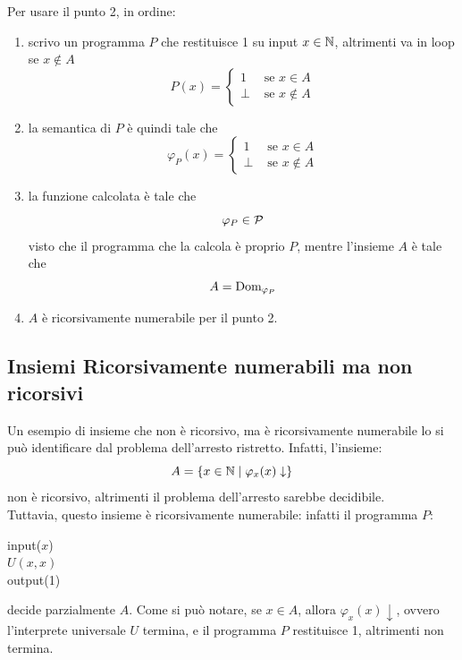 Per usare il punto 2, in ordine: 
\begin{enumerate}
	\item scrivo un programma $P$ che restituisce 1 su input $x \in \mathbb{N}$, altrimenti va in loop se $x \notin A$
	$$ 
	P(x) = \begin{cases}
		1 & \text{ se } x \in A \\
		\bot & \text{ se } x \notin A
	\end{cases}
	$$
	\item la semantica di $P$ è quindi tale che
	$$ 
	\varphi_P (x) = \begin{cases}
		1 & \text{ se } x \in A \\
		\bot & \text{ se } x \notin A
	\end{cases}
	$$
	\item la funzione calcolata è tale che
	$$ \varphi_P \in \mathcal{P} $$
	visto che il programma che la calcola è proprio $P$, mentre l'insieme $A$ è tale che
	$$ A = \text{Dom}_{\varphi_P}$$
	\item $A$ è ricorsivamente numerabile per il punto 2.\\
\end{enumerate}

\subsection{Insiemi Ricorsivamente numerabili ma non ricorsivi}

Un esempio di insieme che non è ricorsivo, ma è ricorsivamente numerabile lo si può identificare dal problema dell'arresto ristretto. Infatti, l'insieme: 
$$ A = \{x \in \mathbb{N} \mid \varphi_x (x) \downarrow\}$$
non è ricorsivo, altrimenti il problema dell'arresto sarebbe decidibile. \\

Tuttavia, questo insieme è ricorsivamente numerabile: infatti il programma $P$:

\begin{center}
	\vspace{1em}\hspace{5em}
	\begin{minipage}{.3\textwidth}
		\begin{tcolorbox}[
			colback=white,
			sharp corners,
			boxrule=.3mm,
			left=20pt,
			top=0pt,
			bottom=0pt,
			colbacktitle=white,
			coltitle=black
			]
			\begin{algorithm}[H]
				\SetAlgoNoEnd
				input($x$) \\
				$U(x,x)$ \\
				output(1)
			\end{algorithm}
		\end{tcolorbox}
	\end{minipage}
\end{center}
decide parzialmente $A$. Come si può notare, se $x \in A$, allora $\varphi_x (x) \downarrow$, ovvero l'interprete universale $U$ termina, e il programma $P$ restituisce 1, altrimenti non termina.\\

